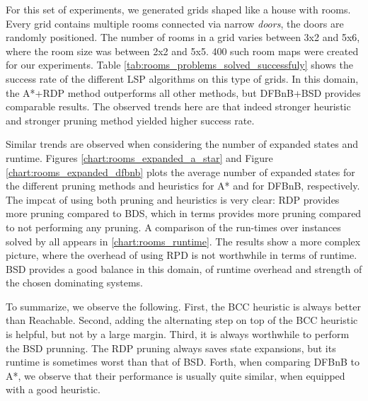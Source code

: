 \documentclass[letterpaper]{article} %
\begin{document}
 For this set of experiments, we generated grids shaped like a house with rooms.
 Every grid contains multiple rooms connected via narrow \textit{doors}, the doors are randomly positioned. %
 The number of rooms in a grid varies between 3x2 and 5x6, where the room size was between 2x2 and 5x5. %
 400 such room maps were created for our experiments.
 Table \ref{tab:rooms_problems_solved_successfuly} shows the success rate of the different LSP algorithms on this type of grids.
 In this domain, the A*+RDP method outperforms all other methods, but DFBnB+BSD provides comparable results.
 The observed trends here are that indeed stronger heuristic and stronger pruning method yielded higher success rate.


Similar trends are observed when considering the number of expanded states and runtime. Figures \ref{chart:rooms_expanded_a_star} and Figure \ref{chart:rooms_expanded_dfbnb} plots the average number of expanded states for the different pruning methods and heuristics
for A* and for DFBnB, respectively. The impcat of using both pruning and heuristics is very clear: RDP provides more pruning compared to BDS, which in terms provides more pruning compared to not performing any pruning. A comparison of the run-times over instances solved by all appears in \ref{chart:rooms_runtime}. The results show a more complex picture, where the overhead of using RPD is not worthwhile in terms of runtime. BSD provides a good balance in this domain, of runtime overhead and strength of the chosen dominating systems.



To summarize, we observe the following. First, the BCC heuristic is always better than Reachable.
Second, adding the alternating step on top of the BCC heuristic is helpful, but not by a large margin.
Third, it is always worthwhile to perform the BSD prunning. The RDP pruning always saves state expansions, but its runtime is sometimes worst than that of BSD.
Forth, when comparing DFBnB to A*, we observe that their performance is usually quite similar, when equipped with a good heuristic.
\end{document}
